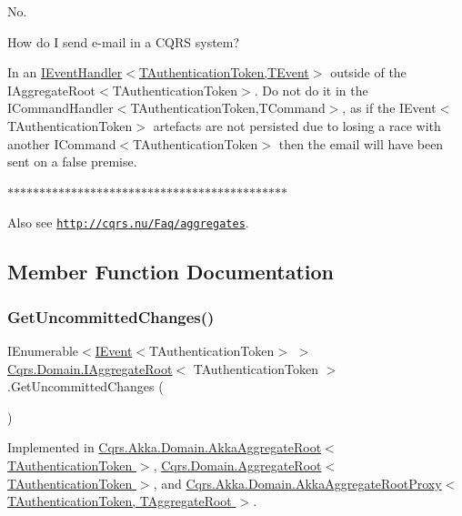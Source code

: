 No. 

How do I send e-\/mail in a C\+Q\+RS system? 

In an \hyperlink{interfaceCqrs_1_1Events_1_1IEventHandler}{I\+Event\+Handler$<$\+T\+Authentication\+Token,\+T\+Event$>$} outside of the I\+Aggregate\+Root$<$\+T\+Authentication\+Token$>$. Do not do it in the I\+Command\+Handler$<$\+T\+Authentication\+Token,\+T\+Command$>$, as if the I\+Event$<$\+T\+Authentication\+Token$>$ artefacts are not persisted due to losing a race with another I\+Command$<$\+T\+Authentication\+Token$>$ then the email will have been sent on a false premise. 

$\ast$$\ast$$\ast$$\ast$$\ast$$\ast$$\ast$$\ast$$\ast$$\ast$$\ast$$\ast$$\ast$$\ast$$\ast$$\ast$$\ast$$\ast$$\ast$$\ast$$\ast$$\ast$$\ast$$\ast$$\ast$$\ast$$\ast$$\ast$$\ast$$\ast$$\ast$$\ast$$\ast$$\ast$$\ast$$\ast$$\ast$$\ast$$\ast$$\ast$$\ast$$\ast$$\ast$$\ast$ 

Also see \href{http://cqrs.nu/Faq/aggregates}{\tt http\+://cqrs.\+nu/\+Faq/aggregates}. 

\subsection{Member Function Documentation}
\mbox{\label{interfaceCqrs_1_1Domain_1_1IAggregateRoot_a22fda414613f5ac0d4371554d7d6473b_a22fda414613f5ac0d4371554d7d6473b}} 
\subsubsection{\texorpdfstring{Get\+Uncommitted\+Changes()}{GetUncommittedChanges()}}
{\footnotesize\ttfamily I\+Enumerable$<$\hyperlink{interfaceCqrs_1_1Events_1_1IEvent}{I\+Event}$<$T\+Authentication\+Token$>$ $>$ \hyperlink{interfaceCqrs_1_1Domain_1_1IAggregateRoot}{Cqrs.\+Domain.\+I\+Aggregate\+Root}$<$ T\+Authentication\+Token $>$.Get\+Uncommitted\+Changes (\begin{DoxyParamCaption}{ }\end{DoxyParamCaption})}



Implemented in \hyperlink{classCqrs_1_1Akka_1_1Domain_1_1AkkaAggregateRoot_a2d11510fec0129ba318f63f7103aeec0_a2d11510fec0129ba318f63f7103aeec0}{Cqrs.\+Akka.\+Domain.\+Akka\+Aggregate\+Root$<$ T\+Authentication\+Token $>$}, \hyperlink{classCqrs_1_1Domain_1_1AggregateRoot_a625e885ec7885a686f729ed1efe3a8fa_a625e885ec7885a686f729ed1efe3a8fa}{Cqrs.\+Domain.\+Aggregate\+Root$<$ T\+Authentication\+Token $>$}, and \hyperlink{classCqrs_1_1Akka_1_1Domain_1_1AkkaAggregateRootProxy_afa620ced4762b0539da23ca063fed489_afa620ced4762b0539da23ca063fed489}{Cqrs.\+Akka.\+Domain.\+Akka\+Aggregate\+Root\+Proxy$<$ T\+Authentication\+Token, T\+Aggregate\+Root $>$}.

